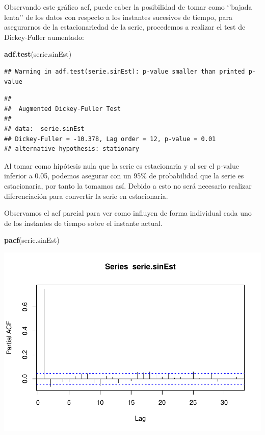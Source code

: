 \documentclass[]{article}
\newenvironment{Shaded}{\begin{snugshade}}{\end{snugshade}}
\newcommand{\KeywordTok}[1]{\textcolor[rgb]{0.13,0.29,0.53}{\textbf{#1}}}
\newcommand{\NormalTok}[1]{#1}
\begin{document}
Observando este gráfico acf, puede caber la posibilidad de tomar como
`'bajada lenta'' de los datos con respecto a los instantes sucesivos de
tiempo, para asegurarnos de la estacionariedad de la serie, procedemos a
realizar el test de Dickey-Fuller aumentado:

\begin{Shaded}
\begin{Highlighting}[]
\KeywordTok{adf.test}\NormalTok{(serie.sinEst)}
\end{Highlighting}
\end{Shaded}

\begin{verbatim}
## Warning in adf.test(serie.sinEst): p-value smaller than printed p-value
\end{verbatim}

\begin{verbatim}
## 
##  Augmented Dickey-Fuller Test
## 
## data:  serie.sinEst
## Dickey-Fuller = -10.378, Lag order = 12, p-value = 0.01
## alternative hypothesis: stationary
\end{verbatim}

Al tomar como hipótesis nula que la serie es estacionaria y al ser el
p-value inferior a 0.05, podemos asegurar con un 95\% de probabilidad
que la serie es estacionaria, por tanto la tomamos así. Debido a esto no
será necesario realizar diferenciación para convertir la serie en
estacionaria.

Observamos el acf parcial para ver como influyen de forma individual
cada uno de los instantes de tiempo sobre el instante actual.

\begin{Shaded}
\begin{Highlighting}[]
\KeywordTok{pacf}\NormalTok{(serie.sinEst)}
\end{Highlighting}
\end{Shaded}

\includegraphics{timeSeries_files/figure-latex/unnamed-chunk-59-1.pdf}
\end{document}
